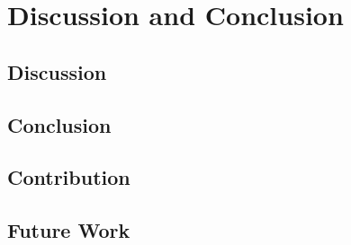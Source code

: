 \graphicspath{{chapters/chapter7/}}
\chapter{Discussion and Conclusion}

\section{Discussion}
\section{Conclusion}
\section{Contribution}
\section{Future Work}